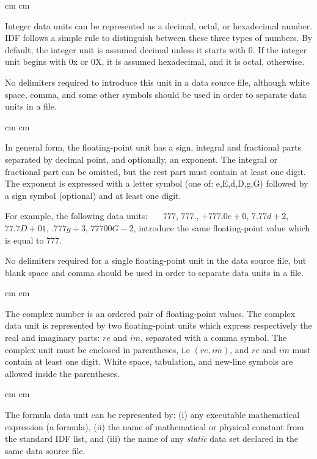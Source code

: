  cm
 cm

Integer data units can be represented as a decimal, octal,
or hexadecimal number. IDF follows a simple rule to
distinguish between these three types of numbers.
By default, the integer unit is assumed decimal unless
it starts with 0. If the integer unit begins with 0x or 0X, it is assumed
hexadecimal, and it is octal, otherwise. 

No delimiters required to introduce this unit in a data source file,
although white space, comma, and some other symbols should be used
in order to separate data units in a file. 

 cm
 cm

In general form, the floating-point unit has a sign, integral and
fractional parts separated by decimal point, and optionally, an exponent.
The integral or fractional part can be omitted, but the rest part
must contain at least one digit.
The exponent is expressed with a letter symbol (one of: e,E,d,D,g,G)
followed by a sign symbol (optional) and at least one digit.

For example, the following data units:\hfil\break
{
\ \ \ $777$, $777.$, $+777.0e+0$, $7.77d+2$, $77.7D+01$, $.777g+3$, $77700G-2$,
}\hfil\break
introduce the same floating-point value which is equal to 777.

No delimiters required for a single floating-point unit in the data source file,
but blank space and comma should be used in order to separate data units
in a file. 

 cm
 cm

The complex number is an ordered pair of floating-point values.
The complex data unit is represented by two floating-point units
which express respectively the real and imaginary parts:
$re$ and $im$, separated with a comma symbol. 
The complex unit must be enclosed in parentheses,
i.e $( re , im )$, and $re$ and $im$ must contain
at least one digit.
White space, tabulation, and new-line symbols
are allowed inside the parentheses.

 cm
 cm

The formula data unit can be represented by:
(i) any executable mathematical expression (a formula),
(ii) the name of mathematical or physical constant
from the standard IDF list, and
(iii) the name of any {\it static} data set
declared in the same data source file.

